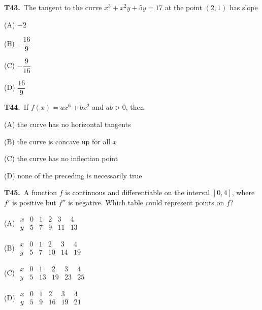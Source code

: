 \documentclass[11pt]{article}
\begin{document}
\bigskip\noindent\textbf{T43.}\ The tangent to the curve $x^3+x^2y+5y=17$ at the point $(2,1)$ has slope
\begin{list}{}{\setlength{\leftmargin}{3em}\setlength{\labelwidth}{2.5em}\setlength{\itemsep}{0pt}\setlength{\topsep}{2pt}}
\item[(A)] $-2$
\item[(B)] $-\dfrac{16}{9}$
\item[(C)] $-\dfrac{9}{16}$
\item[(D)] $\dfrac{16}{9}$
\end{list}

\bigskip\noindent\textbf{T44.}\ If $f(x) = ax^6+bx^2$ and $ab>0$, then
\begin{list}{}{\setlength{\leftmargin}{3em}\setlength{\labelwidth}{2.5em}\setlength{\itemsep}{0pt}\setlength{\topsep}{2pt}}
\item[(A)] the curve has no horizontal tangents
\item[(B)] the curve is concave up for all $x$
\item[(C)] the curve has no inflection point
\item[(D)] none of the preceding is necessarily true
\end{list}

\bigskip\noindent\textbf{T45.}\ A function $f$ is continuous and differentiable on the interval $[0,4]$, where $f'$ is positive but $f''$ is negative. Which table could represent points on $f$?
\begin{list}{}{\setlength{\leftmargin}{3em}\setlength{\labelwidth}{2.5em}\setlength{\itemsep}{0pt}\setlength{\topsep}{2pt}}
\item[(A)] $\begin{array}{c|rrrrr}x&0&1&2&3&4\\y&5&7&9&11&13\end{array}$
\item[(B)] $\begin{array}{c|rrrrr}x&0&1&2&3&4\\y&5&7&10&14&19\end{array}$
\item[(C)] $\begin{array}{c|rrrrr}x&0&1&2&3&4\\y&5&13&19&23&25\end{array}$
\item[(D)] $\begin{array}{c|rrrrr}x&0&1&2&3&4\\y&5&9&16&19&21\end{array}$
\end{list}
\end{document}
